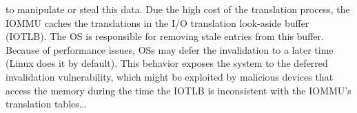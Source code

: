 to manipulate or steal this data. Due the high cost of the translation process, the IOMMU caches the translations in the I/O translation look-aside buffer (IOTLB). The OS is responsible for removing stale entries from this buffer. Because of performance issues, OSs may defer the invalidation to a later time (Linux does it by default). This behavior exposes the system to the deferred invalidation vulnerability, which might be exploited by malicious devices that access the memory during the time the IOTLB is inconsistent with the IOMMU’s translation tables...
 








%



\appendix






